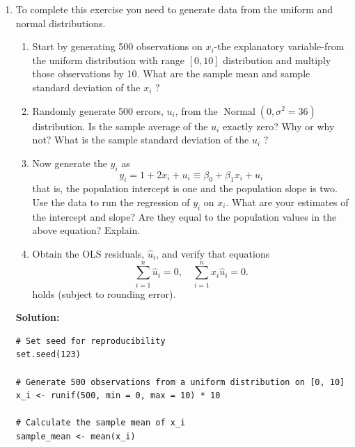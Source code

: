 \documentclass[12pt]{article}
\begin{document}
\begin{enumerate}
{\begin{lstlisting}
# View the regression results
summary(model_log)

# Extract the coefficient for IQ (percentage effect on wage for a one-point increase in IQ)
coef_log_IQ <- coef(model_log)["IQ"]

# Calculate the approximate percentage increase in predicted wage for a 15-point increase in IQ
percentage_increase <- coef_log_IQ * 15 * 100

# Print the results
coef_log_IQ
percentage_increase
\end{lstlisting}

}



\item To complete this exercise you need to generate data from the uniform and normal distributions.
\begin{enumerate}
    \item Start by generating 500 observations on $x_i$-the explanatory variable-from the uniform distribution with range $[0,10]$ distribution and  multiply those observations by 10. What are the sample mean and sample standard deviation of the $x_i$ ?
\item Randomly generate 500 errors, $u_i$, from the $\operatorname{Normal}(0,\sigma^2=36)$ distribution. Is the sample average of the $u_i$ exactly zero? Why or why not? What is the sample standard deviation of the $u_i$ ?
\item Now generate the $y_i$ as
$$
y_i=1+2 x_i+u_i \equiv \beta_0+\beta_1 x_i+u_i
$$
that is, the population intercept is one and the population slope is two. Use the data to run the regression of $y_i$ on $x_i$. What are your estimates of the intercept and slope? Are they equal to the population values in the above equation? Explain.
\item Obtain the OLS residuals, $\hat{u}_i$, and verify that equations
$$
\sum_{i=1}^n \hat{u}_i=0, \quad \sum_{i=1}^n x_i \hat{u}_i=0 .
$$
holds (subject to rounding error).

\end{enumerate}


{\color{blue}
\noindent \textbf{Solution:}

\begin{lstlisting}
# Set seed for reproducibility
set.seed(123)

# Generate 500 observations from a uniform distribution on [0, 10]
x_i <- runif(500, min = 0, max = 10) * 10

# Calculate the sample mean of x_i
sample_mean <- mean(x_i)


\end{lstlisting}}
\end{enumerate}
\end{document}
